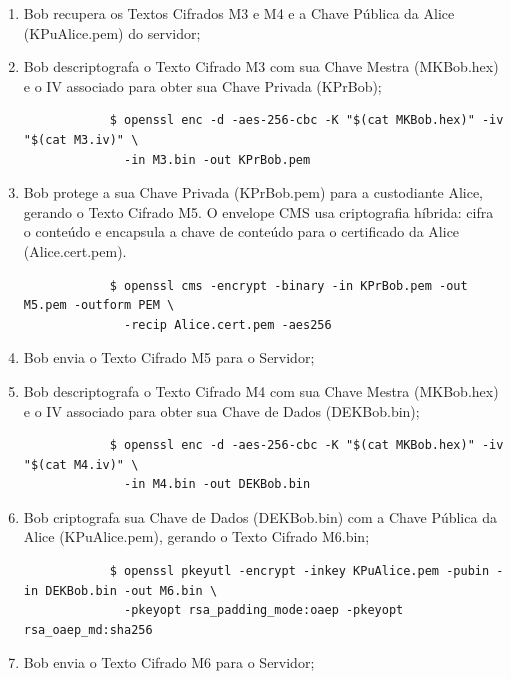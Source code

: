 \begin{enumerate}
	\item Bob recupera os Textos Cifrados M3 e M4 e a Chave Pública da Alice (KPuAlice.pem) do servidor;
	\item Bob descriptografa o Texto Cifrado M3 com sua Chave Mestra (MKBob.hex) e o IV associado para obter sua Chave Privada (KPrBob);
	\begin{tcolorbox}[width=\textwidth]
		{\scriptsize
			\begin{verbatim}
			$ openssl enc -d -aes-256-cbc -K "$(cat MKBob.hex)" -iv "$(cat M3.iv)" \
			  -in M3.bin -out KPrBob.pem
			\end{verbatim}
		}
	\end{tcolorbox}
	\item Bob protege a sua Chave Privada (KPrBob.pem) para a custodiante Alice, gerando o Texto Cifrado M5. O envelope CMS usa criptografia híbrida: cifra o conteúdo e encapsula a chave de conteúdo para o certificado da Alice (Alice.cert.pem).
	\begin{tcolorbox}[width=\textwidth]
		{\scriptsize
			\begin{verbatim}
			$ openssl cms -encrypt -binary -in KPrBob.pem -out M5.pem -outform PEM \
			  -recip Alice.cert.pem -aes256
			\end{verbatim}
		}
	\end{tcolorbox}
	\item Bob envia o Texto Cifrado M5 para o Servidor;
	\item Bob descriptografa o Texto Cifrado M4 com sua Chave Mestra (MKBob.hex) e o IV associado para obter sua Chave de Dados (DEKBob.bin);
	\begin{tcolorbox}[width=\textwidth]
		{\scriptsize
			\begin{verbatim}
			$ openssl enc -d -aes-256-cbc -K "$(cat MKBob.hex)" -iv "$(cat M4.iv)" \
			  -in M4.bin -out DEKBob.bin
			\end{verbatim}
		}
	\end{tcolorbox}
	\item Bob criptografa sua Chave de Dados (DEKBob.bin) com a Chave Pública da Alice (KPuAlice.pem), gerando o Texto Cifrado M6.bin;
	\begin{tcolorbox}[width=\textwidth]
		{\scriptsize
			\begin{verbatim}
			$ openssl pkeyutl -encrypt -inkey KPuAlice.pem -pubin -in DEKBob.bin -out M6.bin \
			  -pkeyopt rsa_padding_mode:oaep -pkeyopt rsa_oaep_md:sha256
			\end{verbatim}
		}
	\end{tcolorbox}	
	\item Bob envia o Texto Cifrado M6 para o Servidor;
\end{enumerate}

\pagebreak
